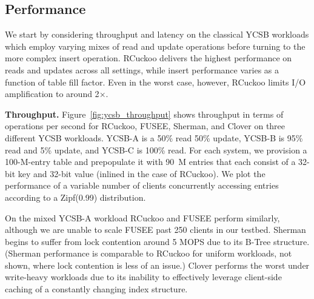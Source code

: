 


\subsection{Performance}

We start by considering throughput and latency on the classical YCSB
workloads which employ varying mixes of read and update operations
before turning to the more complex insert operation.  RCuckoo delivers
the highest performance on reads and updates across all settings,
while insert performance varies as a function of table fill factor.
Even in the worst case, however, RCuckoo limits I/O amplification to
around 2$\times$.

\textbf{Throughput.} Figure~\ref{fig:ycsb_throughput} shows throughput in
terms of operations per second for RCuckoo, FUSEE, Sherman, and Clover
on three different YCSB workloads. YCSB-A is a 50\% read 50\% update,
YCSB-B is 95\% read and 5\% update, and YCSB-C is 100\% read.  For
each system, we provision a 100-M-entry table and prepopulate it with
90~M entries that each consist of a 32-bit key and 32-bit value
(inlined in the case of RCuckoo).  We plot the performance of a
variable number of clients concurrently accessing entries according to
a Zipf(0.99) distribution.

On the mixed YCSB-A workload RCuckoo and FUSEE perform similarly, although we are unable to scale FUSEE past 250 clients in our testbed.
Sherman begins to suffer from lock contention around 5 MOPS due to its B-Tree structure.
(Sherman performance is comparable to RCuckoo for uniform workloads, not shown, where
lock contention is less of an issue.)  Clover performs the worst
under write-heavy workloads due to its inability to effectively leverage
client-side caching of a constantly changing index structure.

